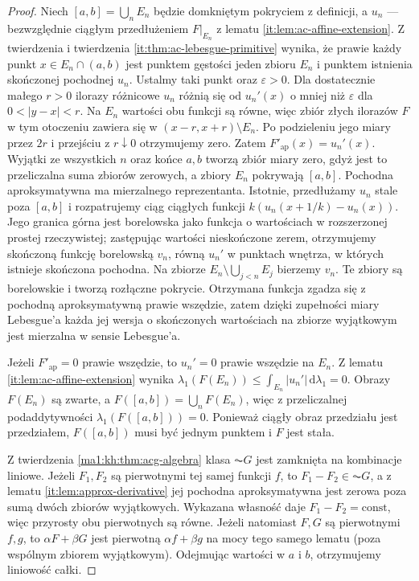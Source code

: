 \begin{proof}
Niech $[a,b]=\bigcup_n E_n$ będzie domkniętym pokryciem z definicji, a $u_n$ --- bezwzględnie ciągłym przedłużeniem $F|_{E_n}$ z lematu \ref{it:lem:ac-affine-extension}. Z twierdzenia  i twierdzenia \ref{it:thm:ac-lebesgue-primitive} wynika, że prawie każdy punkt $x\in E_n\cap(a,b)$ jest punktem gęstości jeden zbioru $E_n$ i punktem istnienia skończonej pochodnej $u_n$. Ustalmy taki punkt oraz $\varepsilon>0$. Dla dostatecznie małego $r>0$ ilorazy różnicowe $u_n$ różnią się od $u_n'(x)$ o mniej niż $\varepsilon$ dla $0<|y-x|<r$. Na $E_n$ wartości obu funkcji są równe, więc zbiór złych ilorazów $F$ w tym otoczeniu zawiera się w $(x-r,x+r)\setminus E_n$. Po podzieleniu jego miary przez $2r$ i przejściu z $r\downarrow0$ otrzymujemy zero. Zatem $F'_{\mathrm{ap}}(x)=u_n'(x)$. Wyjątki ze wszystkich $n$ oraz końce $a,b$ tworzą zbiór miary zero, gdyż jest to przeliczalna suma zbiorów zerowych, a zbiory $E_n$ pokrywają $[a,b]$. Pochodna aproksymatywna ma mierzalnego reprezentanta.
Istotnie, przedłużamy $u_n$ stale poza $[a,b]$ i
rozpatrujemy ciąg ciągłych funkcji
$k(u_n(x+1/k)-u_n(x))$. Jego granica górna jest
borelowska jako funkcja o wartościach w rozszerzonej
prostej rzeczywistej; zastępując wartości nieskończone
zerem, otrzymujemy skończoną funkcję borelowską
$v_n$, równą $u_n'$ w punktach wnętrza, w których
istnieje skończona pochodna. Na zbiorze
$E_n\setminus\bigcup_{j<n}E_j$ bierzemy $v_n$. Te zbiory są borelowskie i tworzą rozłączne pokrycie. Otrzymana funkcja zgadza się z pochodną aproksymatywną prawie wszędzie, zatem dzięki zupełności miary Lebesgue'a każda jej wersja o skończonych wartościach na zbiorze wyjątkowym jest mierzalna w sensie Lebesgue'a.

Jeżeli $F'_{\mathrm{ap}}=0$ prawie wszędzie, to $u_n'=0$ prawie wszędzie na $E_n$. Z lematu \ref{it:lem:ac-affine-extension} wynika $\lambda_1(F(E_n))\le\int_{E_n}|u_n'|\,\mathrm d\lambda_1=0$. Obrazy $F(E_n)$ są zwarte, a $F([a,b])=\bigcup_n F(E_n)$, więc z przeliczalnej podaddytywności $\lambda_1(F([a,b]))=0$. Ponieważ ciągły obraz przedziału jest przedziałem, $F([a,b])$ musi być jednym punktem i $F$ jest stała.

Z twierdzenia \ref{ma1:kh:thm:acg-algebra} klasa $\AC G$ jest zamknięta na kombinacje liniowe.
Jeżeli $F_1,F_2$ są pierwotnymi tej samej funkcji $f$,
to $F_1-F_2\in\AC G$, a z lematu \ref{it:lem:approx-derivative}
jej pochodna aproksymatywna jest zerowa poza sumą dwóch zbiorów wyjątkowych.
Wykazana własność daje $F_1-F_2=\mathrm{const}$, więc przyrosty obu pierwotnych są równe.
Jeżeli natomiast $F,G$ są pierwotnymi $f,g$,
to $\alpha F+\beta G$ jest pierwotną $\alpha f+\beta g$
na mocy tego samego lematu (poza wspólnym zbiorem wyjątkowym).
Odejmując wartości w $a$ i $b$, otrzymujemy liniowość całki.
\end{proof}
